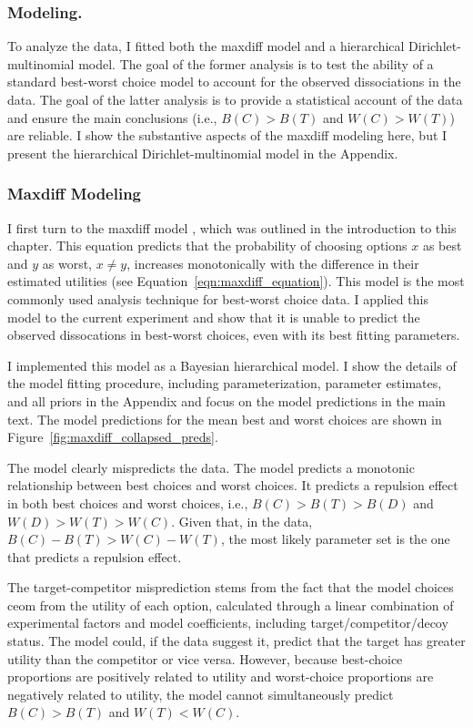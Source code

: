 \subsubsection{Modeling.}

To analyze the data, I fitted both the maxdiff model and a hierarchical Dirichlet-multinomial model. The goal of the former analysis is to test the ability of a standard best-worst choice model to account for the observed dissociations in the data. The goal of the latter analysis is to provide a statistical account of the data and ensure the main conclusions (i.e., $B(C)>B(T)$ and $W(C)>W(T)$) are reliable. I show the substantive aspects of the maxdiff modeling here, but I present the hierarchical Dirichlet-multinomial model in the Appendix.

\subsubsection{Maxdiff Modeling}

I first turn to the maxdiff model \parencite{marleyProbabilisticModelsBest2005}, which was outlined in the introduction to this chapter. This equation predicts that the probability of choosing options $x$ as best and $y$ as worst, $x \neq y$, increases monotonically with the difference in their estimated utilities (see Equation~\ref{eqn:maxdiff_equation}). This model is the most commonly used analysis technique for best-worst choice data. I applied this model to the current experiment and show that it is unable to predict the observed dissocations in best-worst choices, even with its best fitting parameters.

I implemented this model as a Bayesian hierarchical model. I show the details of the model fitting procedure, including parameterization, parameter estimates, and all priors in the Appendix and focus on the model predictions in the main text. The model predictions for the mean best and worst choices are shown in Figure~\ref{fig:maxdiff_collapsed_preds}.

The model clearly mispredicts the data. The model predicts a monotonic relationship between best choices and worst choices. It predicts a repulsion effect in both best choices and worst choices, i.e., $B(C)>B(T)>B(D)$ and $W(D)>W(T)>W(C)$. Given that, in the data, $B(C)-B(T)>W(C)-W(T)$, the most likely parameter set is the one that predicts a repulsion effect. 

The target-competitor misprediction stems from the fact that the model choices ceom from the utility of each option, calculated through a linear combination of experimental factors and model coefficients, including target/competitor/decoy status. The model could, if the data suggest it, predict that the target has greater utility than the competitor or vice versa. However, because best-choice proportions are positively related to utility and worst-choice proportions are negatively related to utility, the model cannot simultaneously predict $B(C)>B(T)$ and $W(T)<W(C)$. 

